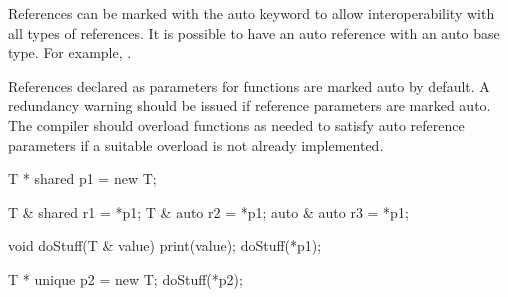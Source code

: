 References can be marked with the auto keyword to allow interoperability with all types of references. It is possible to have an auto reference with an auto base type. For example, .

References declared as parameters for functions are marked auto by default. A redundancy warning should be issued if reference parameters are marked auto. The compiler should overload functions as needed to satisfy auto reference parameters if a suitable overload is not already implemented.

\begin{codeblock}

T * shared p1 = new T;

T & shared r1 = *p1;
T & auto r2 = *p1;
auto & auto r3 = *p1;

void doStuff(T & value) { print(value); }
doStuff(*p1);

T * unique p2 = new T;
doStuff(*p2);

\end{codeblock}